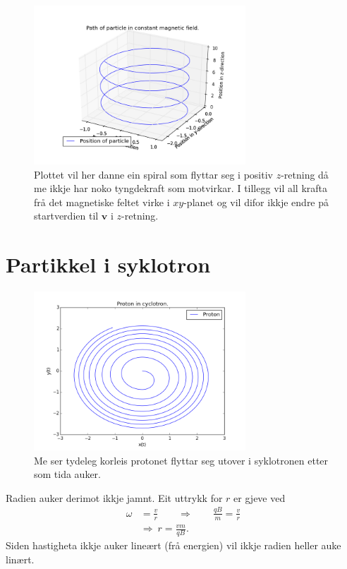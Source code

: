 \documentclass[11pt, a4paper]{article}
\begin{document}
  \begin{figure}[H]
    \centering
    \includegraphics[width=300px]{2A4.png}
    \caption{Plottet vil her danne ein spiral som flyttar seg i positiv $z$-retning då me ikkje har noko tyngdekraft som motvirkar. I tillegg vil all krafta frå det magnetiske 
    feltet virke i $xy$-planet og vil difor ikkje endre på startverdien til $\mathbf{v}$ i $z$-retning.}
  \end{figure}







\newpage
\section{Partikkel i syklotron}

  \begin{figure}[H]
    \centering
    \includegraphics[width=300px]{3A.png}
    \caption{Me ser tydeleg korleis protonet flyttar seg utover i syklotronen etter som tida auker.}
  \end{figure}
  Radien auker derimot ikkje jamnt. Eit uttrykk for $r$ er gjeve ved
  \begin{align*}
    \omega &= \frac{v}{r} \qquad \Rightarrow \qquad \frac{qB}{m} = \frac{v}{r} \\
    &\Rightarrow \ r = \frac{vm}{qB}.
  \end{align*}
  Siden hastigheta ikkje auker lineært (frå energien) vil ikkje radien heller auke linært.
\end{document}
